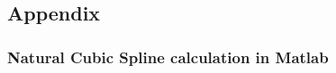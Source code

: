 \documentclass{article}
\begin{document}
    \subsection{Appendix}
    \subsubsection{Natural Cubic Spline calculation in Matlab}
    
\end{document}
